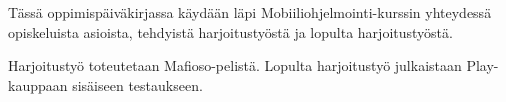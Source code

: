 Tässä oppimispäiväkirjassa käydään läpi Mobiiliohjelmointi-kurssin yhteydessä
opiskeluista asioista, tehdyistä harjoitustyöstä ja lopulta harjoitustyöstä.

Harjoitustyö toteutetaan Mafioso-pelistä. Lopulta harjoitustyö julkaistaan
Play-kauppaan sisäiseen testaukseen.
